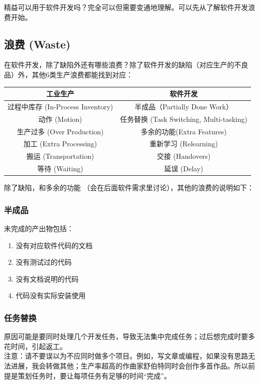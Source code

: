 精益可以用于软件开发吗？完全可以但需要变通地理解。可以先从了解软件开发浪费开始。

\hypertarget{ux6d6aux8d39-waste}{%
\subsection{浪费 (Waste)}\label{ux6d6aux8d39-waste}}

在软件开发，除了缺陷外还有哪些浪费？除了软件开发的缺陷（对应生产的不良品）外，其他6类生产浪费都能找到对应：


\begin{tabular}{|c|c|}
\hline
工业生产 & 软件开发\\
\hline
过程中库存 (In-Process Inventory) & 半成品（Partially Done
Work）\\
\hline
动作 (Motion) & 任务替换 (Task Switching, Multi-tasking)\\
\hline
生产过多 (Over Production) & 多余的功能(Extra Features)\\
\hline
加工 (Extra Processing) & 重新学习 (Relearning)\\
\hline
搬运 (Transportation) & 交接 (Handovers)\\
\hline
等待 (Waiting) & 延误 (Delay)\\
\hline
\end{tabular}

除了缺陷，和多余的功能
（会在后面软件需求里讨论），其他的浪费的说明如下：

\hypertarget{ux534aux6210ux54c1}{%
\subsubsection{半成品}\label{ux534aux6210ux54c1}}

未完成的产出物包括：

\begin{enumerate}
\tightlist
\item
  没有对应软件代码的文档
\item
  没有测试过的代码
\item
  没有文档说明的代码
\item
  代码没有实际安装使用
\end{enumerate}

\hypertarget{ux4efbux52a1ux66ffux6362}{%
\subsubsection{任务替换}\label{ux4efbux52a1ux66ffux6362}}

原因可能是要同时处理几个开发任务，导致无法集中完成任务；过后想完成时要多花时间，引起返工。\\
注意：请不要误以为不应同时做多个项目。例如，写文章或编程，如果没有思路无法进展，我会转做其他；生产率超高的作曲家舒伯特同时会创作多首作品。所以前提是策划任务时，要让每项任务有足够的时间``完成''。

